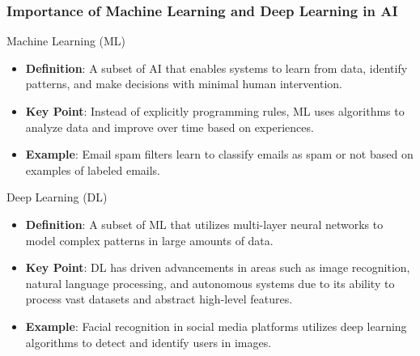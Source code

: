 \documentclass[aspectratio=169]{beamer}
\begin{document}
\begin{frame}[fragile]
    \frametitle{Importance of Machine Learning and Deep Learning in AI}
    \begin{block}{Machine Learning (ML)}
        \begin{itemize}
            \item \textbf{Definition}: A subset of AI that enables systems to learn from data, identify patterns, 
            and make decisions with minimal human intervention.
            \item \textbf{Key Point}: Instead of explicitly programming rules, ML uses algorithms to analyze data 
            and improve over time based on experiences.
            \item \textbf{Example}: Email spam filters learn to classify emails as spam or not based on 
            examples of labeled emails.
        \end{itemize}
    \end{block}

    \begin{block}{Deep Learning (DL)}
        \begin{itemize}
            \item \textbf{Definition}: A subset of ML that utilizes multi-layer neural networks to model complex patterns 
            in large amounts of data.
            \item \textbf{Key Point}: DL has driven advancements in areas such as image recognition, natural 
            language processing, and autonomous systems due to its ability to process vast datasets and abstract high-level features.
            \item \textbf{Example}: Facial recognition in social media platforms utilizes deep learning algorithms 
            to detect and identify users in images.
        \end{itemize}
    \end{block}
\end{frame}
\end{document}
